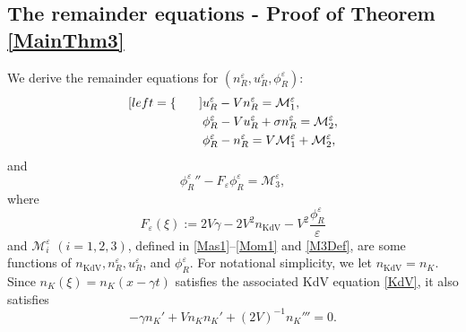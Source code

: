 \documentclass{amsart}
\newcommand{\veps}{\varepsilon}
\numberwithin{equation}{section}
\theoremstyle{plain}%
\theoremstyle{definition}
\theoremstyle{remark}
\theoremstyle{remark}
\begin{document}
\subsection{The remainder equations - Proof of Theorem \ref{MainThm3}}
We derive the remainder equations for $(n_R^\veps,u_R^\veps,\phi_R^\veps)$:
\begin{subequations}\label{Eq for difference}
\begin{align}[left = \empheqlbrace\qquad]
& u_R^\veps-Vn_R^\veps = \mathcal{M}_1^\veps, \label{Mas2a} \\ 
& \phi_R^\veps-Vu_R^\veps+\sigma n_R^\veps = \mathcal{M}_2^\veps, \label{Mom2a} \\
& \phi_R^\veps-n_R^\veps= V\mathcal{M}_1^\veps + \mathcal{M}_2^\veps, \label{VxMas2a+Mom2a}
\end{align}
\end{subequations}
and
\begin{equation}\label{MainEq}
{\phi_{R}^\veps}'' - F_\veps\phi_R^\veps = \mathcal{M}_3^\veps,
\end{equation}
where 
\begin{equation}\label{F}
F_\veps(\xi) :=   2V\gamma  - 2V^2 n_{\text{KdV}} - V^2\frac{\phi_R^\veps}{\veps}
\end{equation}
and $\mathcal{M}_i^\veps$ $(i=1,2,3)$, defined in \eqref{Mas1}--\eqref{Mom1} and \eqref{M3Def}, are some functions   of $n_{\text{KdV}}, n^\veps_{R}, u^\veps_{R}$, and $\phi^\veps_{R}$. For notational simplicity, we let $n_{\text{KdV}}=n_{K}$. Since $n_{K}(\xi) = n_K(x-\gamma t)$ satisfies the associated  KdV equation \eqref{KdV}, it also satisfies 
\begin{equation}\label{KdVinXi}
-\gamma n_{K}' + V n_{K}n_{K}' + (2V)^{-1}n_{K}''' = 0.
\end{equation} 
\end{document}
